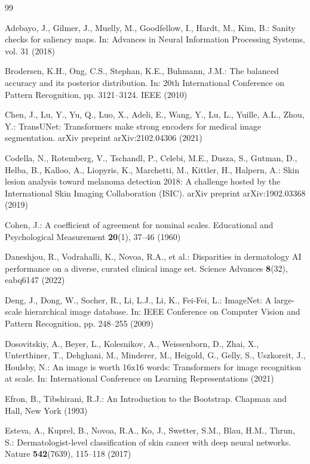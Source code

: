 \documentclass[runningheads]{llncs}
\begin{document}
\begin{thebibliography}{99}

Adebayo, J., Gilmer, J., Muelly, M., Goodfellow, I., Hardt, M., Kim, B.: Sanity checks for saliency maps. In: Advances in Neural Information Processing Systems, vol. 31 (2018)

Brodersen, K.H., Ong, C.S., Stephan, K.E., Buhmann, J.M.: The balanced accuracy and its posterior distribution. In: 20th International Conference on Pattern Recognition, pp. 3121--3124. IEEE (2010)

Chen, J., Lu, Y., Yu, Q., Luo, X., Adeli, E., Wang, Y., Lu, L., Yuille, A.L., Zhou, Y.: TransUNet: Transformers make strong encoders for medical image segmentation. arXiv preprint arXiv:2102.04306 (2021)

Codella, N., Rotemberg, V., Tschandl, P., Celebi, M.E., Dusza, S., Gutman, D., Helba, B., Kalloo, A., Liopyris, K., Marchetti, M., Kittler, H., Halpern, A.: Skin lesion analysis toward melanoma detection 2018: A challenge hosted by the International Skin Imaging Collaboration (ISIC). arXiv preprint arXiv:1902.03368 (2019)

Cohen, J.: A coefficient of agreement for nominal scales. Educational and Psychological Measurement \textbf{20}(1), 37--46 (1960)

Daneshjou, R., Vodrahalli, K., Novoa, R.A., et al.: Disparities in dermatology AI performance on a diverse, curated clinical image set. Science Advances \textbf{8}(32), eabq6147 (2022)

Deng, J., Dong, W., Socher, R., Li, L.J., Li, K., Fei-Fei, L.: ImageNet: A large-scale hierarchical image database. In: IEEE Conference on Computer Vision and Pattern Recognition, pp. 248--255 (2009)

Dosovitskiy, A., Beyer, L., Kolesnikov, A., Weissenborn, D., Zhai, X., Unterthiner, T., Dehghani, M., Minderer, M., Heigold, G., Gelly, S., Uszkoreit, J., Houlsby, N.: An image is worth 16x16 words: Transformers for image recognition at scale. In: International Conference on Learning Representations (2021)

Efron, B., Tibshirani, R.J.: An Introduction to the Bootstrap. Chapman and Hall, New York (1993)

Esteva, A., Kuprel, B., Novoa, R.A., Ko, J., Swetter, S.M., Blau, H.M., Thrun, S.: Dermatologist-level classification of skin cancer with deep neural networks. Nature \textbf{542}(7639), 115--118 (2017)


\end{thebibliography}
\end{document}
